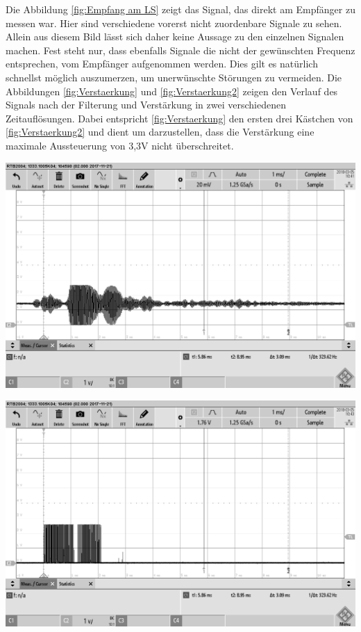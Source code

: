 Die Abbildung \ref{fig:Empfang am LS} zeigt das Signal, das direkt am Empfänger zu messen war. Hier sind verschiedene vorerst nicht zuordenbare Signale zu sehen. Allein aus diesem Bild lässt sich daher keine Aussage zu den einzelnen Signalen machen. Fest steht nur, dass ebenfalls Signale die nicht der gewünschten Frequenz entsprechen, vom Empfänger aufgenommen werden. Dies gilt es natürlich schnellst möglich auszumerzen, um unerwünschte Störungen zu vermeiden.
Die Abbildungen \ref{fig:Verstaerkung} und \ref{fig:Verstaerkung2} zeigen den Verlauf des Signals nach der Filterung und Verstärkung in zwei verschiedenen Zeitauflösungen. Dabei entspricht \ref{fig:Verstaerkung} den ersten drei Kästchen von \ref{fig:Verstaerkung2} und dient um darzustellen, dass die Verstärkung eine maximale Aussteuerung von 3,3V nicht überschreitet.\\
\begin{minipage}{0.5\textwidth}
\includegraphics[width=1\textwidth%
]{Abbildungen/MessungenP1/Signal-nach-Verstarkung2.png}
\label{fig:Verstaerkung2}
\end{minipage}
\begin{minipage}{0.5\textwidth}
\includegraphics[width=1\textwidth%
]{Abbildungen/MessungenP1/Signal-nach-Komparator.png}
\label{fig:Komparator}
\end{minipage}\\
